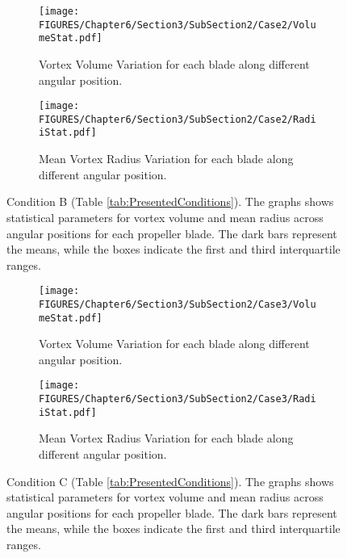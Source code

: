 \begin{figure}[p]
    \centering
    \begin{subfigure}[b]{\textwidth}
        \centering
        \texttt{[image: FIGURES/Chapter6/Section3/SubSection2/Case2/VolumeStat.pdf]}
        \caption{Vortex Volume Variation for each blade along different angular position.}
        \label{fig:VolumeCase2}
    \end{subfigure}
    
    \vfill
    
    \begin{subfigure}[b]{\textwidth}
        \centering
        \texttt{[image: FIGURES/Chapter6/Section3/SubSection2/Case2/RadiiStat.pdf]}
        \caption{Mean Vortex Radius Variation for each blade along different angular position.}
        \label{fig:RadiiCase2}
    \end{subfigure}
    \label{fig:Case2}
    \caption{Condition B (Table \ref{tab:PresentedConditions}). The graphs shows statistical parameters for vortex volume and mean radius across angular positions for each propeller blade. The dark bars represent the means, while the boxes indicate the first and third interquartile ranges.}
\end{figure}

\begin{figure}[p]
    \centering
    \begin{subfigure}[b]{\textwidth}
        \centering
        \texttt{[image: FIGURES/Chapter6/Section3/SubSection2/Case3/VolumeStat.pdf]}
        \caption{Vortex Volume Variation for each blade along different angular position.}
        \label{fig:VolumeCase3}
    \end{subfigure}
    
    \vfill
    
    \begin{subfigure}[b]{\textwidth}
        \centering
        \texttt{[image: FIGURES/Chapter6/Section3/SubSection2/Case3/RadiiStat.pdf]}
        \caption{Mean Vortex Radius Variation for each blade along different angular position.}
        \label{fig:RadiiCase3}
    \end{subfigure}
    \label{fig:Case3}
    \caption{Condition C (Table \ref{tab:PresentedConditions}). The graphs shows statistical parameters for vortex volume and mean radius across angular positions for each propeller blade. The dark bars represent the means, while the boxes indicate the first and third interquartile ranges.}
\end{figure}

